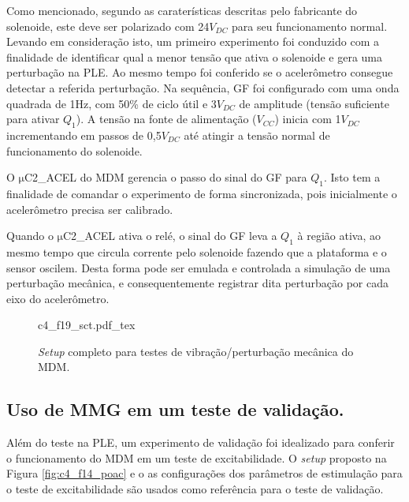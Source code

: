 Como mencionado, segundo as caraterísticas descritas pelo fabricante do solenoide, este deve ser polarizado com 24$V_{DC}$ para seu funcionamento normal. Levando em consideração isto, um primeiro experimento foi conduzido com a finalidade de identificar qual a menor tensão que ativa o solenoide e gera uma perturbação na \acrshort{PLE}. Ao mesmo tempo foi conferido se o acelerômetro consegue detectar a referida perturbação. Na sequência, \acrshort{GF} foi configurado com uma onda quadrada de 1Hz, com 50\% de ciclo útil e 3$V_{DC}$ de amplitude (tensão suficiente para ativar $Q_1$). A tensão na fonte de alimentação ($V_{CC}$) inicia com 1$V_{DC}$ incrementando em passos de 0,5$V_{DC}$ até atingir a tensão normal de funcionamento do solenoide.

O $\mathrm{\mu}$C2\_ACEL do \acrshort{MDM} gerencia o passo do sinal do \acrshort{GF} para $Q_1$. Isto tem a finalidade de comandar o experimento de forma sincronizada, pois inicialmente o acelerômetro precisa ser calibrado.

Quando o $\mathrm{\mu}$C2\_ACEL ativa o relé, o sinal do \acrshort{GF} leva a $Q_1$ à região ativa, ao mesmo tempo que circula corrente pelo solenoide fazendo que a plataforma e o sensor oscilem. Desta forma pode ser emulada e controlada a simulação de uma perturbação mecânica, e consequentemente registrar dita perturbação por cada eixo do acelerômetro.

\newpage

\begin{figure}
    \centering %
    \small %
    \def\svgwidth{1\columnwidth}%
    {c4_f19_sct.pdf_tex}
    \caption{\textit{Setup} completo para testes de vibração/perturbação mecânica do \acrshort{MDM}.}
    \label{fig:c4_f19_sct}
\end{figure}


\vspace{0.5cm}


\subsection*{Uso de \acrshort{MMG} em um teste de validação.}

Além do teste na \acrshort{PLE}, um experimento de validação foi idealizado para conferir o funcionamento do \acrshort{MDM} em um teste de excitabilidade. O \textit{setup} proposto na Figura \ref{fig:c4_f14_poac} e o as configurações dos parâmetros de estimulação para o teste de excitabilidade são usados como referência para o teste de validação. 

